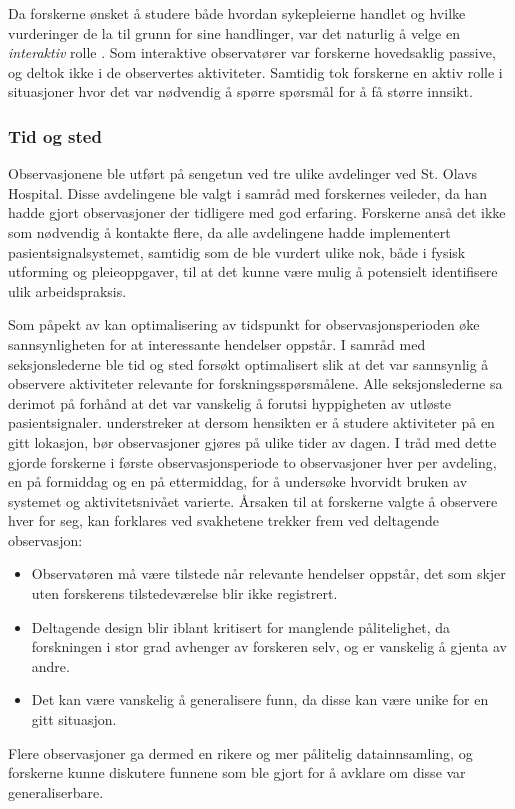 \noindent
Da forskerne ønsket å studere både hvordan sykepleierne handlet og  hvilke vurderinger de la til grunn for sine handlinger, var det naturlig å velge en \textit{interaktiv} rolle \citep{Tjora}. Som interaktive observatører var forskerne hovedsaklig passive, og deltok ikke i de observertes aktiviteter. Samtidig tok forskerne en aktiv rolle i situasjoner hvor det var nødvendig å spørre spørsmål for å få større innsikt.
 
\subsubsection{Tid og sted}
Observasjonene ble utført på sengetun ved tre ulike avdelinger ved St. Olavs Hospital. Disse avdelingene ble valgt i samråd med forskernes veileder, da han hadde gjort observasjoner der tidligere med god erfaring. Forskerne anså det ikke som nødvendig å kontakte flere, da alle avdelingene hadde implementert pasientsignalsystemet, samtidig som de ble vurdert ulike nok, både i fysisk utforming og pleieoppgaver, til at det kunne være mulig å potensielt identifisere ulik arbeidspraksis.
 
\noindent
Som påpekt av \citet{Millen00} kan optimalisering av tidspunkt for observasjonsperioden øke sannsynligheten for at interessante hendelser oppstår. I samråd med seksjonslederne ble tid og sted forsøkt optimalisert slik at det var sannsynlig å observere aktiviteter relevante for forskningsspørsmålene. Alle seksjonslederne sa derimot på forhånd at det var vanskelig å forutsi hyppigheten av utløste pasientsignaler. \citet{Blomberg93} understreker at dersom hensikten er å studere aktiviteter på en gitt lokasjon, bør observasjoner gjøres på ulike tider av dagen. I tråd med dette gjorde forskerne i første observasjonsperiode to observasjoner hver per avdeling, en på formiddag og en på ettermiddag, for å undersøke hvorvidt bruken av systemet og aktivitetsnivået varierte. Årsaken til at forskerne valgte å observere hver for seg, kan forklares ved svakhetene \citet{Oates} trekker frem ved deltagende observasjon: 
\begin{itemize}
\item Observatøren må være tilstede når relevante hendelser oppstår, det som skjer uten forskerens tilstedeværelse blir ikke registrert.
\item Deltagende design blir iblant kritisert for manglende pålitelighet, da forskningen i stor grad avhenger av forskeren selv, og er vanskelig å gjenta av andre.
\item Det kan være vanskelig å generalisere funn, da disse kan være unike for en gitt situasjon.
\end{itemize}
\noindent
Flere observasjoner ga dermed en rikere og mer pålitelig datainnsamling, og forskerne kunne diskutere funnene som ble gjort for å avklare om disse var generaliserbare.

